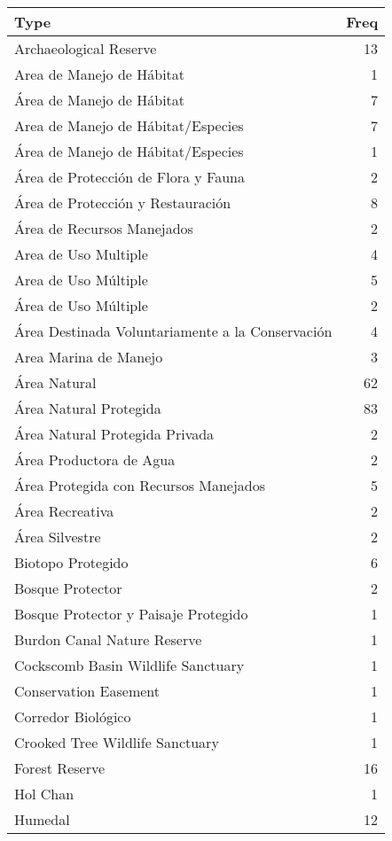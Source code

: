 \documentclass[
]{book}
\begin{document}
\begin{table}
\centering
\begin{tabular}[t]{l|r}
\hline
Type & Freq\\
\hline
Archaeological Reserve & 13\\
\hline
Area de Manejo de Hábitat & 1\\
\hline
Área de Manejo de Hábitat & 7\\
\hline
Area de Manejo de Hábitat/Especies & 7\\
\hline
Área de Manejo de Hábitat/Especies & 1\\
\hline
Área de Protección de Flora y Fauna & 2\\
\hline
Área de Protección y Restauración & 8\\
\hline
Área de Recursos Manejados & 2\\
\hline
Area de Uso Multiple & 4\\
\hline
Area de Uso Múltiple & 5\\
\hline
Área de Uso Múltiple & 2\\
\hline
Área Destinada Voluntariamente a la Conservación & 4\\
\hline
Area Marina de Manejo & 3\\
\hline
Área Natural & 62\\
\hline
Área Natural Protegida & 83\\
\hline
Área Natural Protegida Privada & 2\\
\hline
Área Productora de Agua & 2\\
\hline
Área Protegida con Recursos Manejados & 5\\
\hline
Área Recreativa & 2\\
\hline
Área Silvestre & 2\\
\hline
Biotopo Protegido & 6\\
\hline
Bosque Protector & 2\\
\hline
Bosque Protector y Paisaje Protegido & 1\\
\hline
Burdon Canal Nature Reserve & 1\\
\hline
Cockscomb Basin Wildlife Sanctuary & 1\\
\hline
Conservation Easement & 1\\
\hline
Corredor Biológico & 1\\
\hline
Crooked Tree Wildlife Sanctuary & 1\\
\hline
Forest Reserve & 16\\
\hline
Hol Chan & 1\\
\hline
Humedal & 12\\

\end{tabular}
\end{table}
\end{document}
